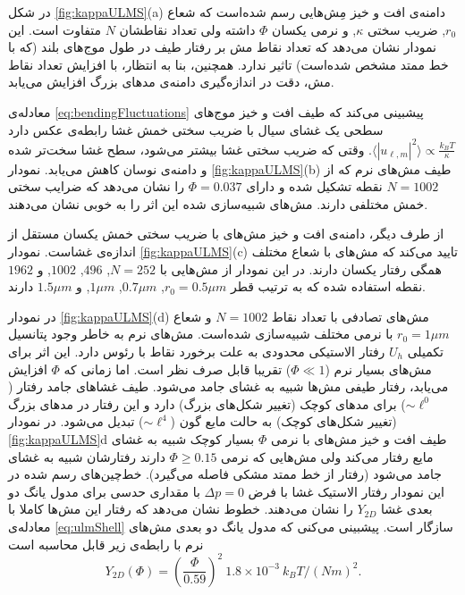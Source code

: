 در شکل
\ref{fig:kappaULMS}(a)
دامنه‌ی افت و خیز مِش‌هایی رسم شده‌است که شعاع
$r_0$,
ضریب سختی
$\kappa$,
 و نرمی یکسان
 $\Phi$
  داشته ولی تعداد نقاطشان
$N$
متفاوت است. این نمودار نشان می‌دهد که تعداد نقاط مش بر رفتار طیف در طول موج‌های بلند (که با خط ممتد مشخص شده‌است) تاثیر ندارد. همچنین، بنا به انتظار، با افزایش تعداد نقاط مش، دقت در اندازه‌گیری دامنه‌ی مد‌های بزرگ افزایش می‌یابد.

معادله‌ی 
\ref{eq:bendingFluctuations}
پیشبینی می‌کند که طیف افت و خیز موج‌های سطحی یک غشای سیال با ضریب سختی خمش غشا رابطه‌ی عکس دارد
$\langle|u_{\ell,m}|^2\rangle\propto \frac{k_BT}{\kappa}$.
 وقتی که ضریب سختی غشا بیشتر می‌شود، سطح غشا سخت‌تر شده و دامنه‌ی نوسان کاهش می‌یابد.  نمودار
\ref{fig:kappaULMS}(b)
 طیف مش‌های نرم که از 
$N=1002$ 
نقطه تشکیل شده و دارای
$\Phi=0.037$ 
را نشان می‌دهد که ضرایب سختی خمش مختلفی دارند. مش‌های شبیه‌سازی شده این اثر را به خوبی نشان می‌دهند. 

از طرف دیگر، دامنه‌ی افت و خیز مش‌های با ضریب سختی خمش یکسان مستقل از اندازه‌ی غشاست. نمودار 
\ref{fig:kappaULMS}(c)
تایید می‌کند که مش‌های با شعاع مختلف همگی رفتار یکسان دارند. در این نمودار از مش‌هایی با 
$N=252$, $496$, $1002$, 
 و
$1962$
نقطه استفاده شده که به ترتیب قطر
 $r_0=0.5\mu m$, $0.7\mu m$, $1\mu m$,
 و 
$1.5 \mu m$
دارند.


در نمودار
\ref{fig:kappaULMS}(d)
مش‌های تصادفی با تعداد نقاط
$N=1002$
و شعاع
$r_0=1 \mu m$
با نرمی مختلف شبیه‌سازی شده‌است. مش‌های نرم به خاطر وجود پتانسیل تکمیلی
$U_h$
رفتار الاستیکی محدودی به علت برخورد نقاط با رئوس دارد. این اثر برای مش‌های بسیار نرم
 ($\Phi\ll1$)
تقریبا قابل صرف نظر است. اما زمانی که 
$\Phi$
افزایش می‌یابد، رفتار طیفی‌ مش‌ها شبیه به غشای جامد می‌شود. طیف غشاهای جامد رفتار
($\sim\ell^0$)
برای مدهای کوچک (تغییر شکل‌های بزرگ) دارد و این رفتار در مد‌های بزرگ (تغییر شکل‌های کوچک) به حالت مایع گون
($\sim\ell^4$)
تبدیل می‌شود. در نمودار
\ref{fig:kappaULMS}d
طیف افت و خیز مش‌های با نرمی 
$\Phi$
بسیار کوچک شبیه به غشای مایع رفتار می‌کند ولی مش‌هایی که نرمی 
$\Phi\geq0.15$
دارند رفتارشان شبیه به غشای جامد می‌شود (رفتار از خط ممتد مشکی فاصله می‌گیرد). خط‌چین‌های رسم شده در این نمودار رفتار الاستیک غشا با فرض 
$\Delta p=0$
با مقداری حدسی برای مدول یانگ دو بعدی غشا
$Y_{2D}$
را نشان می‌دهند. خطوط نشان می‌دهد که رفتار این مش‌ها کاملا با معادله‌ی
\ref{eq:ulmShell}
سازگار است. پیشبینی می‌کنی که مدول یانگ دو بعدی مش‌‌های نرم با رابطه‌ی زیر قابل محاسبه است
\begin{equation}
Y_{2D}(\Phi)= \left(\frac{\Phi}{0.59}\right)^2~1.8\times 10^{-3}~k_BT/(Nm)^2.
\label{eq:YoungPhi}
\end{equation}

